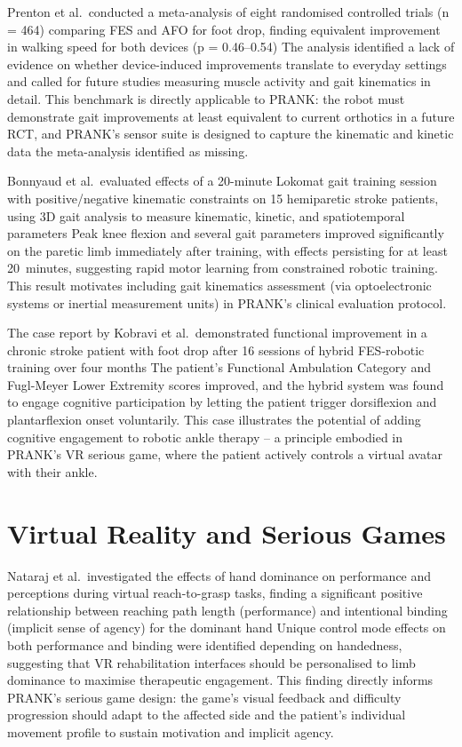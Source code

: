 Prenton et al.\ conducted a meta-analysis of eight randomised controlled trials (n = 464) comparing FES and AFO for foot drop, finding equivalent improvement in walking speed for both devices (p = 0.46--0.54) %
The analysis identified a lack of evidence on whether device-induced improvements translate to everyday settings and called for future studies measuring muscle activity and gait kinematics in detail.
This benchmark is directly applicable to PRANK: the robot must demonstrate gait improvements at least equivalent to current orthotics in a future RCT, and PRANK's sensor suite is designed to capture the kinematic and kinetic data the meta-analysis identified as missing.

Bonnyaud et al.\ evaluated effects of a 20-minute Lokomat gait training session with positive/negative kinematic constraints on 15 hemiparetic stroke patients, using 3D gait analysis to measure kinematic, kinetic, and spatiotemporal parameters %
Peak knee flexion and several gait parameters improved significantly on the paretic limb immediately after training, with effects persisting for at least 20~minutes, suggesting rapid motor learning from constrained robotic training.
This result motivates including gait kinematics assessment (via optoelectronic systems or inertial measurement units) in PRANK's clinical evaluation protocol.

The case report by Kobravi et al.\ demonstrated functional improvement in a chronic stroke patient with foot drop after 16 sessions of hybrid FES-robotic training over four months %
The patient's Functional Ambulation Category and Fugl-Meyer Lower Extremity scores improved, and the hybrid system was found to engage cognitive participation by letting the patient trigger dorsiflexion and plantarflexion onset voluntarily.
This case illustrates the potential of adding cognitive engagement to robotic ankle therapy -- a principle embodied in PRANK's VR serious game, where the patient actively controls a virtual avatar with their ankle.

\section{Virtual Reality and Serious Games}

Nataraj et al.\ investigated the effects of hand dominance on performance and perceptions during virtual reach-to-grasp tasks, finding a significant positive relationship between reaching path length (performance) and intentional binding (implicit sense of agency) for the dominant hand %
Unique control mode effects on both performance and binding were identified depending on handedness, suggesting that VR rehabilitation interfaces should be personalised to limb dominance to maximise therapeutic engagement.
This finding directly informs PRANK's serious game design: the game's visual feedback and difficulty progression should adapt to the affected side and the patient's individual movement profile to sustain motivation and implicit agency.

